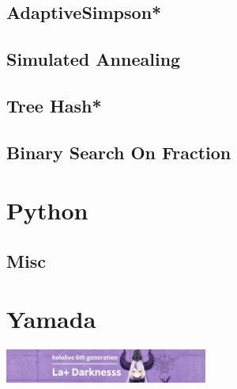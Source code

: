 \subsection{AdaptiveSimpson*} %

\subsection{Simulated Annealing}

\subsection{Tree Hash*} %

\subsection{Binary Search On Fraction}

% 
% 
% 

\section{Python}
\subsection{Misc}


\section{Yamada}
\includegraphics[width=0.5\textwidth]{short_channels4_banner.jpg}
